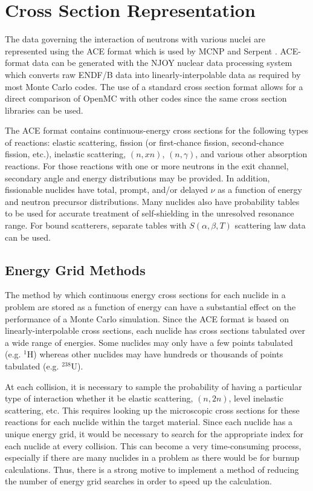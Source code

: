 \section{Cross Section Representation}

The data governing the interaction of neutrons with various nuclei are
represented using the ACE format \cite{lanl-x5-2008-ace} which is used by MCNP
\cite{lanl-x5-2008} and Serpent \cite{vtt-leppanen-2007}. ACE-format data can be
generated with the NJOY nuclear data processing system
\cite{nds-macfarlane-2010} which converts raw ENDF/B data
\cite{nds-chadwick-2011} into linearly-interpolable data as required by most
Monte Carlo codes. The use of a standard cross section format allows for a
direct comparison of OpenMC with other codes since the same cross section
libraries can be used.

The ACE format contains continuous-energy cross sections for the following types
of reactions: elastic scattering, fission (or first-chance fission,
second-chance fission, etc.), inelastic scattering, $(n,xn)$, $(n,\gamma)$, and
various other absorption reactions. For those reactions with one or more
neutrons in the exit channel, secondary angle and energy distributions may be
provided. In addition, fissionable nuclides have total, prompt, and/or delayed
$\nu$ as a function of energy and neutron precursor distributions. Many nuclides
also have probability tables to be used for accurate treatment of self-shielding
in the unresolved resonance range. For bound scatterers, separate tables with
$S(\alpha,\beta,T)$ scattering law data can be used.

\subsection{Energy Grid Methods}

The method by which continuous energy cross sections for each nuclide in a
problem are stored as a function of energy can have a substantial effect on the
performance of a Monte Carlo simulation. Since the ACE format is based on
linearly-interpolable cross sections, each nuclide has cross sections tabulated
over a wide range of energies. Some nuclides may only have a few points
tabulated (e.g. $^1$H) whereas other nuclides may have hundreds or thousands of
points tabulated (e.g. $^{238}$U).

At each collision, it is necessary to sample the probability of having a
particular type of interaction whether it be elastic scattering, $(n,2n)$, level
inelastic scattering, etc. This requires looking up the microscopic cross
sections for these reactions for each nuclide within the target material. Since
each nuclide has a unique energy grid, it would be necessary to search for the
appropriate index for each nuclide at every collision. This can become a very
time-consuming process, especially if there are many nuclides in a problem as
there would be for burnup calculations. Thus, there is a strong motive to
implement a method of reducing the number of energy grid searches in order to
speed up the calculation.

